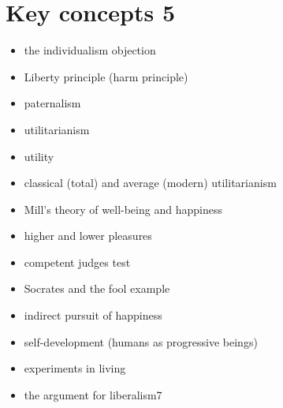 \section{Key concepts 5}
\begin{itemize}
	\item the individualism objection
	\item Liberty principle (harm principle)
	\item paternalism
	\item utilitarianism
	\item utility
	\item classical (total) and average (modern) utilitarianism
	\item Mill’s theory of well-being and happiness
	\item higher and lower pleasures
	\item competent judges test
	\item Socrates and the fool example
	\item indirect pursuit of happiness
	\item self-development (humans as progressive beings)
	\item experiments in living
	\item the argument for liberalism7
\end{itemize}
